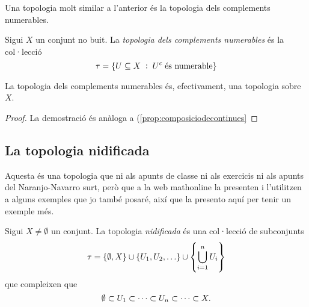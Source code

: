 \documentclass[../main.tex]{subfiles}
\begin{document}
Una topologia molt similar a l'anterior és la topologia dels complements numerables.

\begin{defi}
\label{def:topologiadelscomplementsnumerables} Sigui $X$ un conjunt no buit. La \textit{topologia dels complements numerables} és la col·lecció
\begin{equation}
    \notag
    \tau = \{U\subseteq X\;:\;U^c\;\text{és numerable}\}
\end{equation}
\end{defi}

\begin{prop}
\label{prop:topologiadelscomplementsnumerables} La topologia dels complements numerables és, efectivament, una topologia sobre $X$.
\end{prop}
\begin{proof}
La demostració és anàloga a (\ref{prop:composiciodecontinues}
\end{proof}

\subsection{La topologia nidificada}

Aquesta és una topologia que ni als apunts de classe ni als exercicis ni als apunts del Naranjo-Navarro surt, però que a la web mathonline la presenten i l'utilitzen a alguns exemples que jo també posaré, així que la presento aquí per tenir un exemple més.

\begin{defi}
\label{def:topologianidificada} Sigui $X\not=\emptyset$ un conjunt. La topologia \textit{nidificada} és una col·lecció de subconjunts
\begin{equation}
    \notag
    \tau = \{\emptyset,X\}\cup\{U_1,U_2,\ldots\}\cup\left\{\bigcup_{i=1}^nU_i\right\}
\end{equation}
que compleixen que
\begin{equation}
    \notag
    \emptyset\subset U_1\subset\cdots\subset U_n\subset\cdots\subset X.
\end{equation}
\end{defi}
\end{document}
